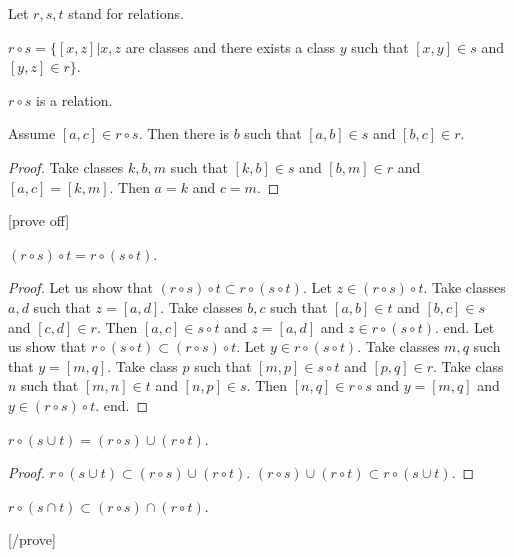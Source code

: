 \documentclass[a4paper,draft]{amsproc}
\begin{document}
\begin{forthel}
Let $r, s, t$ stand for relations.


\begin{definition}[57]
$r \circ s = \{[x,z] | x,z$ are classes and there exists a class $y$ such that 
	$[x,y] \in s$ and $[y,z] \in r\}$. 
\end{definition}

\begin{lemma}
$r \circ s$ is a relation.
\end{lemma}

\begin{lemma}
Assume $[a,c] \in r \circ s$. Then there is $b$ such that $[a,b] \in s$ and $[b,c] \in r$.
\end{lemma}
\begin{proof}
Take classes $k,b,m$ such that $[k,b] \in s$ and $[b,m] \in r$ and $[a,c] = [k,m]$.
Then $a = k$ and $c = m$.
\end{proof}

[prove off]
\begin{theorem}[58]
$(r \circ s) \circ t = r \circ (s \circ t)$.
\end{theorem}
\begin{proof}
Let us show that $(r \circ s) \circ t \subset r \circ (s \circ t)$.
  Let $z \in (r \circ s) \circ t$.
  Take classes $a,d$ such that $z = [a,d]$.
  Take classes $b,c$ such that $[a,b] \in t$ and $[b,c] \in s$ and $[c,d] \in r$.
  Then $[a,c] \in s \circ t$ and $z = [a,d]$ and $z \in r \circ (s \circ t)$.
end.
Let us show that $r \circ (s \circ t) \subset (r \circ s) \circ t$.
  Let $y \in r \circ (s \circ t)$.
  Take classes $m,q$ such that $y = [m,q]$.
  Take class $p$ such that $[m,p] \in s \circ t$ and $[p,q] \in r$.
  Take class $n$ such that $[m,n] \in t$ and $[n,p] \in s$.
  Then $[n,q] \in r \circ s$ and $y = [m,q]$ and $y \in (r \circ s) \circ t$.
end.
\end{proof}

\begin{theorem}[59a]
$r \circ (s \cup t) = (r \circ s) \cup (r \circ t)$.
\end{theorem}
\begin{proof}
$r \circ (s \cup t) \subset (r \circ s) \cup (r \circ t)$.
$(r \circ s) \cup (r \circ t) \subset r \circ (s \cup t)$.
\end{proof}

\begin{theorem}[59b]
$r \circ (s \cap t) \subset (r \circ s) \cap (r \circ t)$.
\end{theorem}
[/prove]


\end{forthel}
\end{document}
